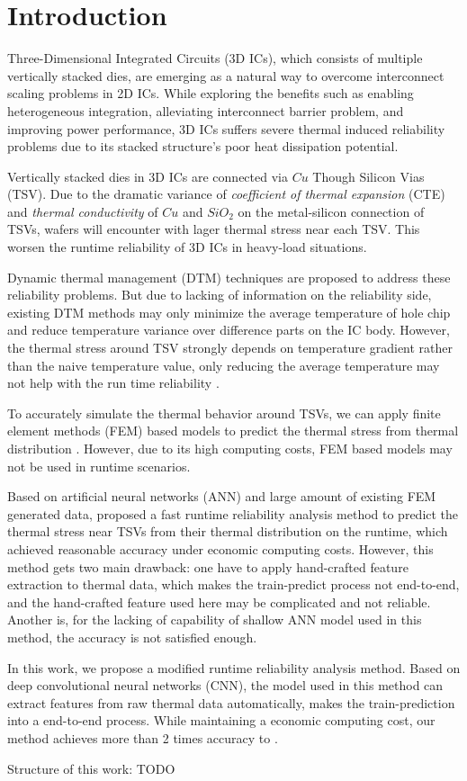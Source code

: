 
\chapter{Introduction}

Three-Dimensional Integrated Circuits (3D ICs),
which consists of multiple vertically stacked dies, 
are emerging as a natural way to overcome interconnect scaling problems in 2D ICs.
While exploring the benefits such as enabling heterogeneous integration, 
alleviating interconnect barrier problem, and improving power performance, 
3D ICs suffers severe thermal induced reliability problems due to its
stacked structure's poor heat dissipation potential.

Vertically stacked dies in 3D ICs are connected via $Cu$ Though Silicon Vias (TSV)\cite{beyne2008through}. 
Due to the dramatic variance of 
\textit{coefficient of thermal expansion} (CTE) and \textit{thermal conductivity}
of $Cu$ and $SiO_2$ on the metal-silicon connection of TSVs, 
wafers will encounter with lager thermal stress near each TSV.
This worsen the runtime reliability of 3D ICs in heavy-load situations.

Dynamic thermal management (DTM) techniques are proposed to address these reliability
problems. But due to lacking of information on the reliability side, existing DTM 
methods may only minimize the average temperature of hole chip and reduce temperature
variance over difference parts on the IC body\cite{zou2013thermomechanical}.
However, the thermal stress around TSV strongly depends on temperature gradient rather
than the naive temperature value, only reducing the average temperature may not help with
the run time reliability \cite{zhang2016fast}.

To accurately simulate the thermal behavior around TSVs, we can apply finite element methods (FEM)
based models to predict the thermal stress from thermal distribution \cite{lu2009thermo}. 
However, due to its high computing costs, FEM based models may not be used in runtime scenarios.

Based on artificial neural networks (ANN) and large amount of existing FEM generated data, 
\cite{zhang2016fast} proposed a fast runtime reliability analysis method to predict the 
thermal stress near TSVs from their thermal distribution on the
runtime, which achieved reasonable accuracy under economic computing costs.
However, this method gets two main drawback: one have to apply hand-crafted feature extraction to
thermal data, which makes the train-predict process not end-to-end, and the hand-crafted feature used here
may be complicated and not reliable. Another is, 
for the lacking of capability of shallow ANN model used in this method, 
the accuracy is not satisfied enough.

In this work, we propose a modified runtime reliability analysis method.
Based on deep convolutional neural networks (CNN), the model used in this method can extract features from raw
thermal data automatically, makes the train-prediction into a end-to-end process.
While maintaining a economic computing cost, our method achieves more than 2 times accuracy to \cite{zhang2016fast}.

Structure of this work: TODO

